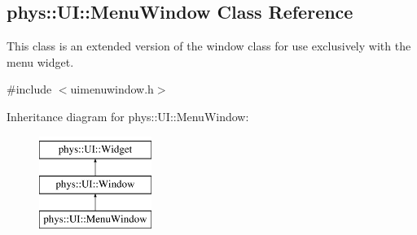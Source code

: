 \hypertarget{classphys_1_1UI_1_1MenuWindow}{
\subsection{phys::UI::MenuWindow Class Reference}
\label{d4/d07/classphys_1_1UI_1_1MenuWindow}
}


This class is an extended version of the window class for use exclusively with the menu widget.  




{\ttfamily \#include $<$uimenuwindow.h$>$}

Inheritance diagram for phys::UI::MenuWindow:\begin{figure}[H]
\begin{center}
\leavevmode
\includegraphics[height=3.000000cm]{d4/d07/classphys_1_1UI_1_1MenuWindow}
\end{center}
\end{figure}
